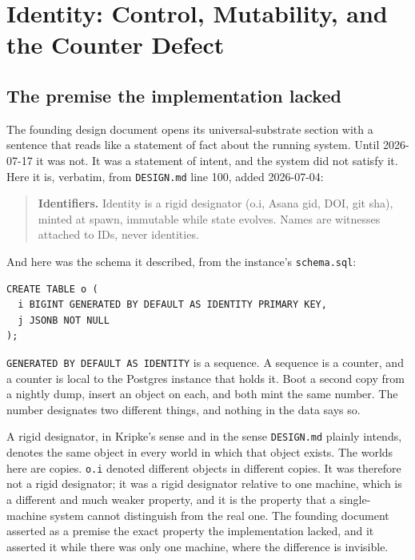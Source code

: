 \chapter{Identity: Control, Mutability, and the Counter Defect}

\section{The premise the implementation lacked}

The founding design document opens its universal-substrate section with a sentence that reads like a statement of fact about the running system. Until 2026-07-17 it was not. It was a statement of intent, and the system did not satisfy it. Here it is, verbatim, from \texttt{DESIGN.md} line 100, added 2026-07-04:

\begin{quote}
\textbf{Identifiers.} Identity is a rigid designator (o.i, Asana gid, DOI, git sha), minted at spawn, immutable while state evolves. Names are witnesses attached to IDs, never identities.
\end{quote}

And here was the schema it described, from the \labLineageName{} instance's \texttt{schema.sql}:

\begin{lstlisting}
CREATE TABLE o (
  i BIGINT GENERATED BY DEFAULT AS IDENTITY PRIMARY KEY,
  j JSONB NOT NULL
);
\end{lstlisting}

\texttt{GENERATED BY DEFAULT AS IDENTITY} is a sequence. A sequence is a counter, and a counter is local to the Postgres instance that holds it. Boot a second copy from a nightly dump, insert an object on each, and both mint the same number. The number designates two different things, and nothing in the data says so.

A rigid designator, in Kripke's sense and in the sense \texttt{DESIGN.md} plainly intends, denotes the same object in every world in which that object exists. The worlds here are copies. \texttt{o.i} denoted different objects in different copies. It was therefore not a rigid designator; it was a rigid designator relative to one machine, which is a different and much weaker property, and it is the property that a single-machine system cannot distinguish from the real one. The founding document asserted as a premise the exact property the implementation lacked, and it asserted it while there was only one machine, where the difference is invisible.

